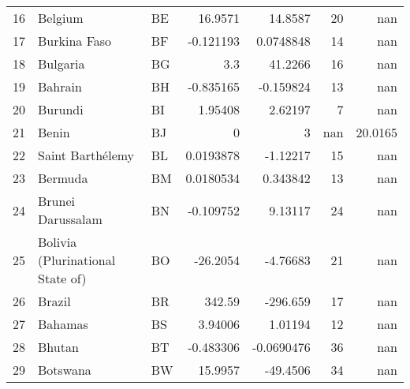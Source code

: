 \begin{tabular}{rllrrrr}
 16 & Belgium                          & BE         &   16.9571     &    14.8587    &     20 &     nan      \\
 17 & Burkina Faso                     & BF         &   -0.121193   &     0.0748848 &     14 &     nan      \\
 18 & Bulgaria                         & BG         &    3.3        &    41.2266    &     16 &     nan      \\
 19 & Bahrain                          & BH         &   -0.835165   &    -0.159824  &     13 &     nan      \\
 20 & Burundi                          & BI         &    1.95408    &     2.62197   &      7 &     nan      \\
 21 & Benin                            & BJ         &    0          &     3         &    nan &      20.0165 \\
 22 & Saint Barthélemy                 & BL         &    0.0193878  &    -1.12217   &     15 &     nan      \\
 23 & Bermuda                          & BM         &    0.0180534  &     0.343842  &     13 &     nan      \\
 24 & Brunei Darussalam                & BN         &   -0.109752   &     9.13117   &     24 &     nan      \\
 25 & Bolivia (Plurinational State of) & BO         &  -26.2054     &    -4.76683   &     21 &     nan      \\
 26 & Brazil                           & BR         &  342.59       &  -296.659     &     17 &     nan      \\
 27 & Bahamas                          & BS         &    3.94006    &     1.01194   &     12 &     nan      \\
 28 & Bhutan                           & BT         &   -0.483306   &    -0.0690476 &     36 &     nan      \\
 29 & Botswana                         & BW         &   15.9957     &   -49.4506    &     34 &     nan      \\
\hline
\end{tabular}